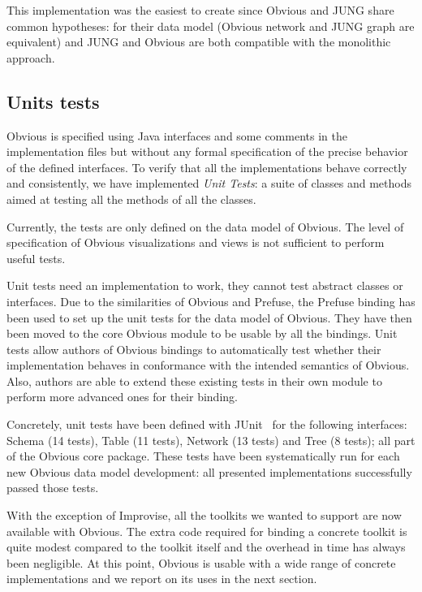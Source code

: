 This implementation was the easiest to create since Obvious and JUNG
share common hypotheses: for their data model (Obvious network and
JUNG graph are equivalent) and JUNG and Obvious are both compatible
with the monolithic approach.  


\subsection{Units tests}
\label{sub:unittests}

Obvious is specified using Java interfaces and some comments in the
implementation files but without any formal specification of the
precise behavior of the defined interfaces.  To verify that all the
implementations behave correctly and consistently, we have implemented
\emph{Unit Tests}: a suite of classes and methods aimed at testing all
the methods of all the classes.

Currently, the tests are only defined on the data model of Obvious.
The level of specification of Obvious visualizations and views is not
sufficient to perform useful tests.

Unit tests need an implementation to work, they cannot test abstract
classes or interfaces.  Due to the similarities of Obvious and
Prefuse, the Prefuse binding has been used to set up the unit tests
for the data model of Obvious.  They have then been moved to the core
Obvious module to be usable by all the bindings.  Unit tests allow
authors of Obvious bindings to automatically test whether their
implementation behaves in conformance with the intended semantics of
Obvious.  Also, authors are able to extend these existing tests in
their own module to perform more advanced ones for their binding.

Concretely, unit tests have been defined with JUnit~\cite{JUnit} for
the following interfaces: Schema (14 tests), Table (11 tests), Network
(13 tests) and Tree (8 tests); all part of the Obvious core package.
These tests have been systematically run for each new Obvious data
model development: all presented implementations successfully passed
those tests.



With the exception of Improvise, all the toolkits we wanted to support
are now available with Obvious.  The extra code required for binding a
concrete toolkit is quite modest compared to the toolkit itself and
the overhead in time has always been negligible.  At this point,
Obvious is usable with a wide range of concrete implementations and we
report on its uses in the next section.

